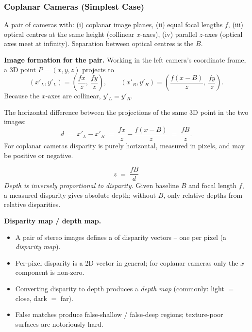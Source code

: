 \bigseparator

\subsubsection{Coplanar Cameras (Simplest Case)}

\begin{defbox}
A pair of cameras with: (i) coplanar image planes, (ii) equal focal lengths $f$, (iii) optical centres at the same height (collinear $x$-axes), (iv) parallel $z$-axes (optical axes meet at infinity). Separation between optical centres is the  $B$.
\end{defbox}

\textbf{Image formation for the pair.} Working in the left camera's coordinate frame, a 3D point $P=(x,y,z)$ projects to
\[
(x'_L, y'_L) = \left(\frac{f x}{z},\ \frac{f y}{z}\right), \qquad (x'_R, y'_R) = \left(\frac{f (x-B)}{z},\ \frac{f y}{z}\right).
\]
Because the $x$-axes are collinear, $y'_L = y'_R$.

\separator

\begin{defbox}
The horizontal difference between the projections of the same 3D point in the two images:
\[
d \;=\; x'_L - x'_R \;=\; \frac{f x}{z} - \frac{f(x-B)}{z} \;=\; \frac{f B}{z}.
\]
For coplanar cameras disparity is purely horizontal, measured in pixels, and may be positive or negative.
\end{defbox}

\begin{thmbox}
\[
\boxed{\,z \;=\; \frac{f B}{d}\,}
\]
\emph{Depth is inversely proportional to disparity.} Given baseline $B$ and focal length $f$, a measured disparity gives absolute depth; without $B$, only relative depths from relative disparities.
\end{thmbox}

\separator

\textbf{Disparity map / depth map.}
\begin{itemize}
  \item A pair of stereo images defines a  of disparity vectors -- one per pixel (a \emph{disparity map}).
  \item Per-pixel disparity is a 2D vector in general; for coplanar cameras only the $x$ component is non-zero.
  \item Converting disparity to depth produces a \emph{depth map} (commonly: light $=$ close, dark $=$ far).
  \item False matches produce false-shallow / false-deep regions; texture-poor surfaces are notoriously hard.
\end{itemize}

